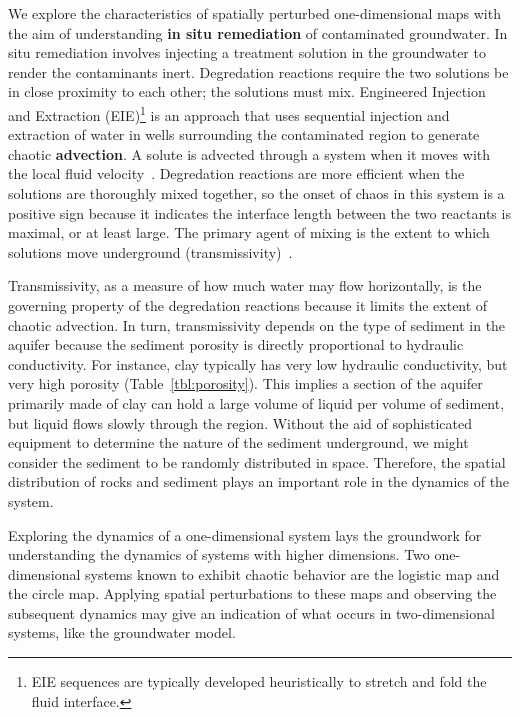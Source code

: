 We explore the characteristics of spatially perturbed one-dimensional
maps with the aim of understanding \textbf{in situ remediation} of contaminated
groundwater. In situ remediation involves injecting a treatment
solution in the groundwater to render the contaminants
inert. Degredation reactions require the two solutions be in close proximity to each other; the solutions must mix. Engineered Injection and Extraction (EIE)\footnote{EIE sequences are typically developed
heuristically to stretch and fold the fluid interface.} is an
approach that uses sequential injection and extraction of water in wells surrounding
the contaminated region to generate chaotic \textbf{advection}. A
solute is advected through a system when it moves with the local fluid
velocity~\cite{advection}. Degredation reactions are more efficient when the solutions are thoroughly mixed
together, so the onset of chaos in this system is a positive sign
because it indicates the interface length between the two reactants is
maximal, or at least large. The primary agent of mixing is the extent to which
solutions move underground (transmissivity)~\cite{neupauer}. 

Transmissivity, as a measure of how
much water may flow horizontally, is the governing property of the
degredation reactions because it limits the extent of chaotic advection. In turn, transmissivity depends on the type of sediment in
the aquifer because the sediment porosity is directly proportional to
hydraulic conductivity. For instance, clay typically has
very low hydraulic conductivity, but very high porosity (Table~\ref{tbl:porosity}). This
implies a section of the aquifer primarily made of clay can hold a
large volume of liquid per volume of sediment, but liquid flows slowly
through the region. Without the aid of sophisticated equipment to
determine the nature of the sediment underground, we might consider
the sediment to be randomly distributed in space. Therefore, the
spatial distribution of rocks and sediment plays an important role in the dynamics of the system. 

Exploring the dynamics of a one-dimensional system lays the groundwork
for understanding the dynamics of systems with higher dimensions. Two
one-dimensional systems known to exhibit chaotic behavior are the
logistic map and the circle map. Applying spatial perturbations to
these maps and observing the subsequent dynamics may give an
indication of what occurs in two-dimensional systems, like the
groundwater model. 

